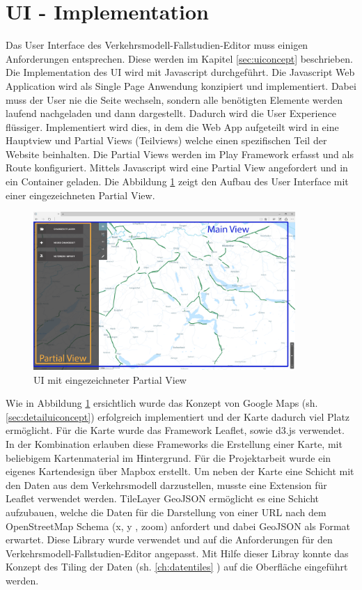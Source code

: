 \section{UI - Implementation}
Das User Interface des Verkehrsmodell-Fallstudien-Editor muss einigen Anforderungen entsprechen. Diese werden im Kapitel \ref{sec:uiconcept}  beschrieben. Die Implementation des UI wird mit Javascript durchgeführt. Die Javascript Web Application wird als Single Page Anwendung konzipiert und implementiert. Dabei muss der User nie die Seite wechseln, sondern alle benötigten Elemente werden laufend nachgeladen und dann dargestellt. Dadurch wird die User Experience flüssiger. Implementiert wird dies, in dem die Web App aufgeteilt wird in eine Hauptview und Partial Views (Teilviews) welche einen spezifischen Teil der Website beinhalten. Die Partial Views werden im Play Framework erfasst und als Route konfiguriert. Mittels Javascript wird eine Partial View angefordert und in ein Container geladen. Die Abbildung \ref{fig:mainviewpartialview} zeigt den Aufbau des User Interface mit einer eingezeichneten Partial View.
\begin{figure}[H]
\centering
\includegraphics[height=6cm]{images/MainviewPartialview.PNG}
\caption{UI mit eingezeichneter Partial View}
\label{fig:mainviewpartialview}
\end{figure}
\noindent
Wie in Abbildung \ref{fig:mainviewpartialview} ersichtlich wurde das Konzept von Google Maps (sh. \ref{sec:detailuiconcept}) erfolgreich implementiert und der Karte dadurch viel Platz ermöglicht. Für die Karte wurde das Framework Leaflet\cite{Leaflet}, sowie d3.js\cite{D3JS} verwendet. In der Kombination erlauben diese Frameworks die Erstellung einer Karte, mit beliebigem Kartenmaterial im Hintergrund. Für die Projektarbeit wurde ein eigenes Kartendesign über Mapbox\cite{Mapbox} erstellt. Um neben der Karte eine Schicht mit den Daten aus dem Verkehrsmodell darzustellen, musste eine Extension für Leaflet verwendet werden. TileLayer GeoJSON \cite{LeafletGeoJSON} ermöglicht es eine Schicht aufzubauen, welche die Daten für die Darstellung von einer URL nach dem OpenStreetMap Schema (x, y , zoom) anfordert und dabei GeoJSON als Format erwartet. Diese Library wurde verwendet und auf die Anforderungen für den Verkehrsmodell-Fallstudien-Editor angepasst. Mit Hilfe dieser Libray konnte das Konzept des Tiling der Daten (sh. \ref{ch:datentiles} ) auf die Oberfläche eingeführt werden.
